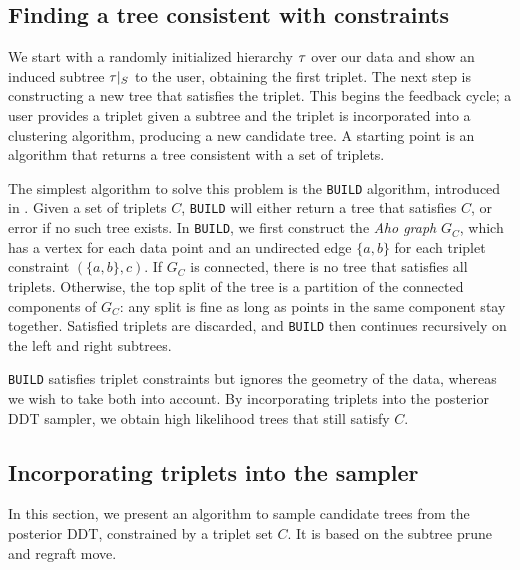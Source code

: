\subsection{Finding a tree consistent with constraints}
\label{sec:aho}
We start with a randomly initialized hierarchy $\tau$
over our data
and show an induced subtree $\tau|_S$ to the user, obtaining the
first triplet. The next step is constructing  
a new tree that satisfies the triplet.
This begins the feedback cycle; a user provides a triplet
given a subtree and the triplet is incorporated into a clustering algorithm,
producing a new candidate tree.
A starting point is 
an algorithm that returns 
a tree consistent with a set of triplets.

The simplest algorithm to solve this problem is
the \texttt{BUILD} algorithm, introduced in \citet{Aho1981}.
Given a set of triplets $C$, \texttt{BUILD}
will either return a tree that satisfies $C$, or error 
if no such tree exists.
In \texttt{BUILD}, we first construct the {\it Aho graph}
$G_C$, which has a vertex for each data point and an 
undirected edge $\{a,b\}$ for each triplet constraint $(\{a,b\},c)$.
If $G_C$ is connected, there is no tree that satisfies all
triplets. Otherwise, the top split of the tree is a partition of 
the connected components of $G_C$: any split is fine as long as 
points in the same component stay together. Satisfied triplets are discarded, and \texttt{BUILD} then continues recursively on the
left and right subtrees.

\texttt{BUILD} satisfies triplet constraints but ignores 
the geometry of the data, whereas we wish to take both into
account. By incorporating triplets into the posterior DDT 
sampler, we obtain high likelihood trees that still satisfy $C$.


\subsection{Incorporating triplets into the sampler}

In this section, we present an algorithm
to sample candidate trees 
from the posterior DDT, constrained
by a triplet set $C$.
It is based on the subtree prune and regraft move.

